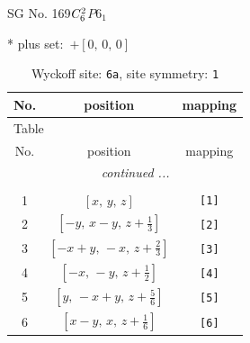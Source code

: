 \documentclass[fleqn,8pt]{jsarticle}
\begin{document}
\setcounter{MaxMatrixCols}{32}

\renewcommand{\tablename}{Table~}
\renewcommand{\figurename}{Figure~}
\begin{center}
\LARGE
SG No. 169\quad$C_{\rm 6}^{2}$\quad$P6_1$\quad[ hexagonal ]
\end{center}
* plus set:\,\,\,$+\left[ 0,\, 0,\, 0 \right]$
\renewcommand{\arraystretch}{1.2}
\begin{longtable}{ccc}
\caption{Wyckoff site: {\tt 6a}, site symmetry: {\tt 1}}
 \\
 \hline \hline
No. & position & mapping \\ \hline \endfirsthead

\multicolumn{2}{l}{\tablename\ \thetable{}} \\
 \hline \hline
No. & position & mapping \\ \hline \endhead

 \hline \hline
\multicolumn{2}{r}{\footnotesize\it continued ...} \\ \endfoot

 \hline \hline
\multicolumn{2}{r}{} \\ \endlastfoot

1 & $\left[ x,\, y,\, z \right]$ & {\tt [1]} \\ \hline
2 & $\left[ - y,\, x - y,\, z + \frac{1}{3} \right]$ & {\tt [2]} \\ \hline
3 & $\left[ - x + y,\, - x,\, z + \frac{2}{3} \right]$ & {\tt [3]} \\ \hline
4 & $\left[ - x,\, - y,\, z + \frac{1}{2} \right]$ & {\tt [4]} \\ \hline
5 & $\left[ y,\, - x + y,\, z + \frac{5}{6} \right]$ & {\tt [5]} \\ \hline
6 & $\left[ x - y,\, x,\, z + \frac{1}{6} \right]$ & {\tt [6]} \\
\end{longtable}
\end{document}
